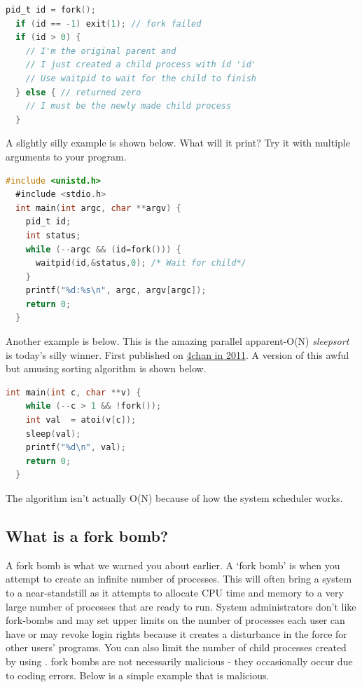 \begin{itemize}
\begin{lstlisting}[language=C]
  pid_t id = fork();
  if (id == -1) exit(1); // fork failed
  if (id > 0) {
    // I'm the original parent and
    // I just created a child process with id 'id'
    // Use waitpid to wait for the child to finish
  } else { // returned zero
    // I must be the newly made child process
  }
\end{lstlisting}

A slightly silly example is shown below. What will it print? Try it with multiple arguments to your program.

\begin{lstlisting}[language=C]
  #include <unistd.h>
  #include <stdio.h>
  int main(int argc, char **argv) {
    pid_t id;
    int status;
    while (--argc && (id=fork())) {
      waitpid(id,&status,0); /* Wait for child*/
    }
    printf("%d:%s\n", argc, argv[argc]);
    return 0;
  }
\end{lstlisting}

Another example is below.
This is the amazing parallel apparent-O(N) \emph{sleepsort} is today's silly winner. First published on \href{https://dis.4chan.org/read/prog/1295544154}{4chan in 2011}. A version of this awful but amusing sorting algorithm is shown below.

\begin{lstlisting}[language=C]
  int main(int c, char **v) {
    while (--c > 1 && !fork());
    int val  = atoi(v[c]);
    sleep(val);
    printf("%d\n", val);
    return 0;
  }
\end{lstlisting}

The algorithm isn't actually O(N) because of how the system scheduler works.

\subsection{What is a fork bomb?}

A fork bomb is what we warned you about earlier.
A `fork bomb' is when you attempt to create an infinite number of processes.
This will often bring a system to a near-standstill as it attempts to allocate CPU time and memory to a very large number of processes that are ready to run.
System administrators don't like fork-bombs and may set upper limits on the number of processes each user can have or may revoke login rights because it creates a disturbance in the force for other users' programs.
You can also limit the number of child processes created by using . fork bombs are not necessarily malicious - they occasionally occur due to coding errors.
Below is a simple example that is malicious.


\end{itemize}
